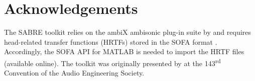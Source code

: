 \section*{Acknowledgements}
The SABRE toolkit relies on the ambiX ambisonic plug-in suite by \citet{Kronlachner2013,ambiXPlugInURL} and requires head-related transfer functions (HRTFs) stored in the SOFA format \citep{AES69-2015,SOFAMainPageURL}.
Accordingly, the SOFA API for MATLAB is needed to import the HRTF files (available online).
The toolkit was originally presented by \citet{TylkaChoueiri2017b} at the 143\textsuperscript{rd} Convention of the Audio Engineering Society.
